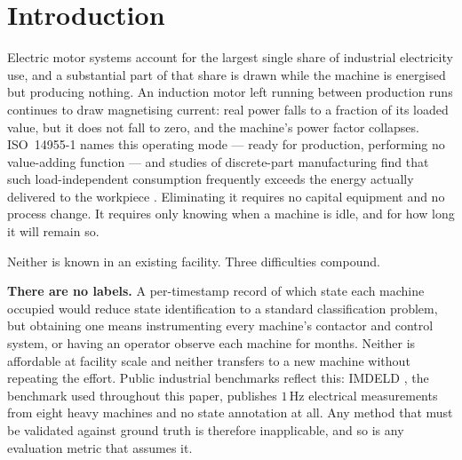 %
%
%
%

\section{Introduction}
\label{sec:intro}

Electric motor systems account for the largest single share of
industrial electricity use, and a substantial part of that share is
drawn while the machine is energised but producing nothing. An induction
motor left running between production runs continues to draw magnetising
current: real power falls to a fraction of its loaded value, but it does
not fall to zero, and the machine's power factor collapses. ISO~14955-1
\cite{iso14955} names this operating mode --- ready for production,
performing no value-adding function --- and studies of discrete-part
manufacturing find that such load-independent consumption frequently
exceeds the energy actually delivered to the workpiece
\cite{gutowski2006electrical,dahmus2004environmental}. Eliminating it
requires no capital equipment and no process change. It requires only
knowing when a machine is idle, and for how long it will remain so.

Neither is known in an existing facility. Three difficulties compound.

\textbf{There are no labels.} A per-timestamp record of which state each
machine occupied would reduce state identification to a standard
classification problem, but obtaining one means instrumenting every
machine's contactor and control system, or having an operator observe
each machine for months. Neither is affordable at facility scale and
neither transfers to a new machine without repeating the effort. Public
industrial benchmarks reflect this: IMDELD
\cite{martins2018imdeld,imdeld2018dataset}, the benchmark used
throughout this paper, publishes $1$\,Hz electrical measurements from
eight heavy machines and no state annotation at all. Any method that
must be validated against ground truth is therefore inapplicable, and
so is any evaluation metric that assumes it.

